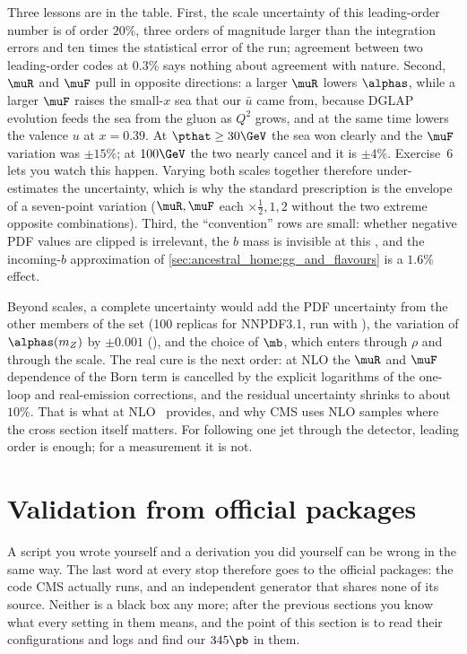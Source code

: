 Three lessons are in the table. First, the scale uncertainty of this
leading-order number is of order $20\%$, three orders of magnitude larger
than the integration errors and ten times the statistical error of the
\CMSSW run; agreement between two leading-order codes at $0.3\%$ says
nothing about agreement with nature. Second, $\muR$ and $\muF$ pull in
opposite directions: a larger $\muR$ lowers $\alphas$, while a larger $\muF$
raises the small-$x$ sea that our $\bar u$ came from, because DGLAP evolution
feeds the sea from the gluon as $Q^2$ grows, and at the same time lowers the
valence $u$ at $x=0.39$. At $\pthat\ge30\GeV$ the sea won clearly and the
$\muF$ variation was $\pm15\%$; at $100\GeV$ the two nearly cancel and it
is $\pm4\%$. Exercise~6 lets you watch this happen. Varying both scales
together therefore under-estimates the uncertainty, which is why the standard
prescription is the envelope of a seven-point variation ($\muR,\muF$ each
$\times\tfrac12,1,2$ without the two extreme opposite combinations). Third,
the ``convention'' rows are small: whether negative PDF values are clipped is
irrelevant, the $b$ mass is invisible at this \pt, and the incoming-$b$
approximation of \cref{sec:ancestral_home:gg_and_flavours} is a $1.6\%$
effect.

Beyond scales, a complete uncertainty would add the PDF uncertainty from the
other members of the set (100 replicas for NNPDF3.1, run with
), the variation of $\alphas(m_Z)$ by $\pm0.001$
(), and the choice of $\mb$, which enters through $\rho$
and through the scale. The real cure is the next order: at NLO the $\muR$
and $\muF$ dependence of the Born term is cancelled by the explicit
logarithms of the one-loop and real-emission corrections, and the residual
uncertainty shrinks to about $10\%$. That is what \MG at
NLO~\cite{Alwall:2014hca} provides, and why CMS uses NLO samples where the
cross section itself matters. For following one jet through the detector,
leading order is enough; for a measurement it is not.

\section{Validation from official packages}
\label{sec:ancestral_home:validation}

A script you wrote yourself and a derivation you did yourself can be wrong
in the same way. The last word at every stop therefore goes to the official
packages: the code CMS actually runs, and an independent generator that
shares none of its source. Neither is a black box any more; after the
previous sections you know what every setting in them means, and the point
of this section is to read their configurations and logs and find our
$345\pb$ in them.

